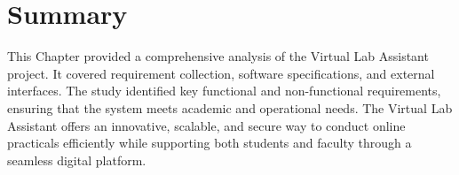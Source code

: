 





\section{Summary}
This Chapter provided a comprehensive analysis of the Virtual Lab Assistant project.
It covered requirement collection, software specifications, and external interfaces.
The study identified key functional and non-functional requirements, ensuring that the system meets academic and operational needs.
The Virtual Lab Assistant offers an innovative, scalable, and secure way to conduct online practicals efficiently while supporting both students and faculty through a seamless digital platform.
